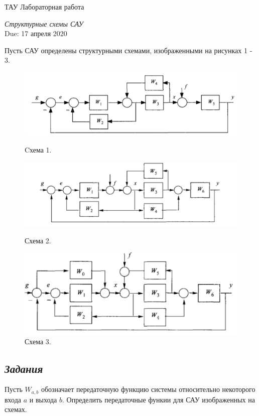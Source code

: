 \documentclass[a4paper,oneside,10pt]{book}
\theoremstyle{definition}
\begin{document}
\begin{center}
	{\large  ТАУ \hspace{0.1cm} Лабораторная работа }

	\vspace{5pt}
	\textit{\large Структурные схемы САУ}\\ %
	\vspace{10pt}
	Due: 17 апреля 2020 %
\end{center}

\vspace{0.2 cm}



Пусть САУ определены структурными схемами, изображенными на рисунках 1 - 3.


\begin{figure}[h]
	\centering
	\includegraphics[width=0.7\linewidth]{1.PNG}
	\caption{Cхема 1.} \label{Fig:ForkJoinExample}

	\includegraphics[width=0.7\linewidth]{2.PNG}
	\caption{Схема 2.} \label{Fig:ForkJoinExample}

	\includegraphics[width=0.6\linewidth]{3.PNG}
	\caption{Схема 3.} \label{Fig:ForkJoinExample}
\end{figure}

\subsection*{\textit{Задания}}
Пусть $W_{a, b}$ обозначает передаточную функцию системы  относительно некоторого входа $a$ и выхода $b$.
Определить передаточные функии для САУ изображенных на схемах.
\end{document}
